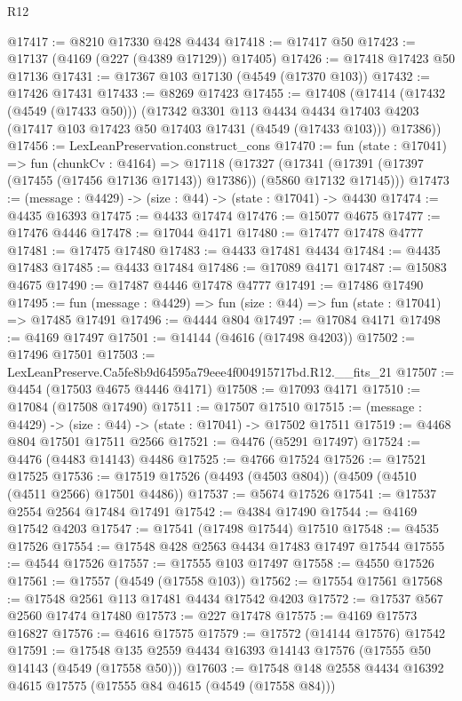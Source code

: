 \begin{lexlean}{R12}
\begin{coremodule}
@17417 := @8210 @17330 @428 @4434
@17418 := @17417 @50
@17423 := @17137 (@4169 (@227 (@4389 @17129)) @17405)
@17426 := @17418 @17423 @50 @17136
@17431 := @17367 @103 @17130 (@4549 (@17370 @103))
@17432 := @17426 @17431
@17433 := @8269 @17423
@17455 := @17408
    (@17414
      (@17432 (@4549 (@17433 @50)))
      (@17342
        @3301
        @113
        @4434
        @4434
        @17403
        @4203
        (@17417 @103 @17423 @50 @17403 @17431 (@4549 (@17433 @103)))
        @17386))
@17456 := LexLeanPreservation.construct_cons
@17470 := fun (state : @17041) =>
  fun (chunkCv : @4164) =>
  @17118
    (@17327 (@17341 (@17391 (@17397 (@17455 (@17456 @17136 @17143)) @17386)) (@5860 @17132 @17145)))
@17473 := (message : @4429) -> (size : @44) -> (state : @17041) -> @4430
@17474 := @4435 @16393
@17475 := @4433 @17474
@17476 := @15077 @4675
@17477 := @17476 @4446
@17478 := @17044 @4171
@17480 := @17477 @17478 @4777
@17481 := @17475 @17480
@17483 := @4433 @17481 @4434
@17484 := @4435 @17483
@17485 := @4433 @17484
@17486 := @17089 @4171
@17487 := @15083 @4675
@17490 := @17487 @4446 @17478 @4777
@17491 := @17486 @17490
@17495 := fun (message : @4429) => fun (size : @44) => fun (state : @17041) => @17485 @17491
@17496 := @4444 @804
@17497 := @17084 @4171
@17498 := @4169 @17497
@17501 := @14144 (@4616 (@17498 @4203))
@17502 := @17496 @17501
@17503 := LexLeanPreserve.Ca5fe8b9d64595a79eee4f004915717bd.R12.__fits_21
@17507 := @4454 (@17503 @4675 @4446 @4171)
@17508 := @17093 @4171
@17510 := @17084 (@17508 @17490)
@17511 := @17507 @17510
@17515 := (message : @4429) -> (size : @44) -> (state : @17041) -> @17502 @17511
@17519 := @4468 @804 @17501 @17511 @2566
@17521 := @4476 (@5291 @17497)
@17524 := @4476 (@4483 @14143) @4486
@17525 := @4766 @17524
@17526 := @17521 @17525
@17536 := @17519 @17526 (@4493 (@4503 @804)) (@4509 (@4510 (@4511 @2566) @17501 @4486))
@17537 := @5674 @17526
@17541 := @17537 @2554 @2564 @17484 @17491
@17542 := @4384 @17490
@17544 := @4169 @17542 @4203
@17547 := @17541 (@17498 @17544) @17510
@17548 := @4535 @17526
@17554 := @17548 @428 @2563 @4434 @17483 @17497 @17544
@17555 := @4544 @17526
@17557 := @17555 @103 @17497
@17558 := @4550 @17526
@17561 := @17557 (@4549 (@17558 @103))
@17562 := @17554 @17561
@17568 := @17548 @2561 @113 @17481 @4434 @17542 @4203
@17572 := @17537 @567 @2560 @17474 @17480
@17573 := @227 @17478
@17575 := @4169 @17573 @16827
@17576 := @4616 @17575
@17579 := @17572 (@14144 @17576) @17542
@17591 := @17548 @135 @2559 @4434 @16393 @14143 @17576 (@17555 @50 @14143 (@4549 (@17558 @50)))
@17603 := @17548 @148 @2558 @4434 @16392 @4615 @17575 (@17555 @84 @4615 (@4549 (@17558 @84)))

\end{coremodule}
\end{lexlean}
